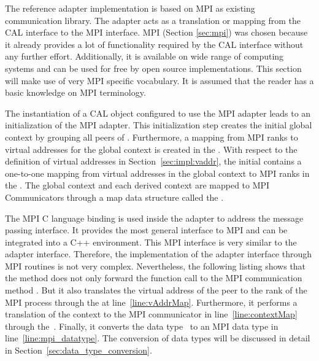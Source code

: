 The reference adapter implementation is based on MPI as existing
communication library. The adapter acts as a translation or mapping
from the CAL interface to the MPI interface.  MPI (Section
\ref{sec:mpi}) was chosen because it already provides a lot of
functionality required by the CAL interface without any further
effort. Additionally, it is available on wide range of computing
systems and can be used for free by open source implementations. This
section will make use of very MPI specific vocabulary. It is assumed
that the reader has a basic knowledge on MPI terminology.

The instantiation of a CAL object configured to use the MPI adapter
leads to an initialization of the MPI adapter. This initialization
step creates the initial global context by grouping all peers of
.  Furthermore, a mapping from MPI ranks to
virtual addresses for the global context is created in the
.  With respect to the definition of virtual addresses
in Section~\ref{sec:impl:vaddr}, the initial  contains a
one-to-one mapping from virtual addresses in the global context to MPI
ranks in the .  The global context and each
derived context are mapped to MPI Communicators through a map data
structure called the .


The MPI C language binding is used inside the adapter to address the
message passing interface.  It provides the most general interface to
MPI and can be integrated into a C++ environment.  This MPI interface
is very similar to the adapter interface. Therefore, the
implementation of the adapter interface through MPI routines is not
very complex. Nevertheless, the following listing shows that the
 method does not only forward the function call to
the MPI communication method .  But it also translates
the virtual address  of the peer to the rank of the
MPI process through the  at line~\ref{line:vAddrMap}.
Furthermore, it performs a translation of the context to the MPI
communicator in line~\ref{line:contextMap} through
the~. Finally, it converts the data type~
to an MPI data type in line~\ref{line:mpi_datatype}.  The conversion
of data types will be discussed in detail in
Section~\ref{sec:data_type_conversion}.

